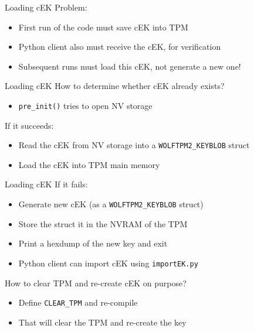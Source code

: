 \begin{frame}{Loading cEK}
Problem:
\begin{itemize}
\item First run of the code must save cEK into TPM
\item Python client also must receive the cEK, for verification
\item Subsequent runs must load this cEK, not generate a new one!
\end{itemize}
\end{frame}

\begin{frame}{Loading cEK}
How to determine whether cEK already exists?
\begin{itemize}
\item \texttt{pre\_init()} tries to open NV storage
\end{itemize}

If it succeeds:
\begin{itemize}
\item Read the cEK from NV storage into a \texttt{WOLFTPM2\_KEYBLOB} struct
\item Load the cEK into TPM main memory
\end{itemize}
\end{frame}

\begin{frame}{Loading cEK}
If it fails:

\begin{itemize}
\item Generate new cEK (as a \texttt{WOLFTPM2\_KEYBLOB} struct)
\item Store the struct it in the NVRAM of the TPM
\item Print a hexdump of the new key and exit
\item Python client can import cEK using \texttt{importEK.py}
\end{itemize}

How to clear TPM and re-create cEK on purpose?

\begin{itemize}
\item Define \texttt{CLEAR\_TPM} and re-compile
\item That will clear the TPM and re-create the key
\end{itemize}
\end{frame}

%
